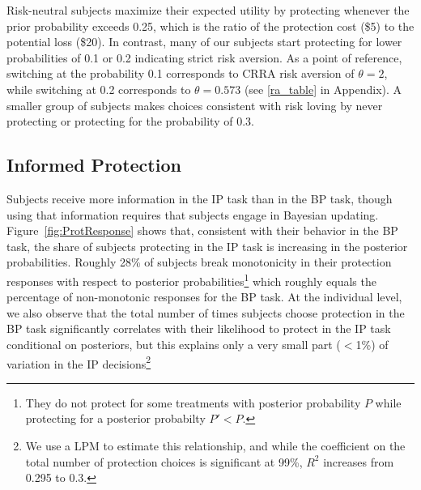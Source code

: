 \documentclass[12pt,a4paper]{article}
\begin{document}
Risk-neutral subjects maximize their expected utility by protecting whenever the prior probability exceeds 0.25, which is the ratio of the protection cost (\$5) to the potential loss (\$20). In contrast, many of our subjects start protecting for lower probabilities of 0.1 or 0.2 indicating strict risk aversion. As a point of reference, switching at the probability 0.1 corresponds to CRRA risk aversion of $\theta=2$, while switching at 0.2 corresponds to $\theta=0.573$ (see \ref{ra_table} in Appendix).  A smaller group of subjects makes choices consistent with risk loving by never protecting or protecting for the probability of 0.3. 

\subsection{Informed Protection}
Subjects receive more information in the IP task than in the BP task, though using that information requires that subjects engage in Bayesian updating.  Figure~\ref{fig:ProtResponse} shows that, consistent with their behavior in the BP task, the share of subjects protecting in the IP task is increasing in the posterior probabilities. Roughly 28\% of subjects break monotonicity in their protection responses with respect to posterior probabilities\footnote{ They do not protect for some treatments with posterior probability $P$ while protecting for a posterior probabilty $P'<P$.} which roughly equals the percentage of non-monotonic responses for the BP task. At the individual level, we also observe that the total number of times subjects choose protection in the BP task significantly correlates with their likelihood to protect in the IP task conditional on posteriors, but this explains only a very small part ($<$1\%) of variation in the IP decisions\footnote{We use a LPM to estimate this relationship, and while the coefficient on the total number of protection choices is significant at 99\%, $R^2$ increases from 0.295 to 0.3.} 


\end{document}
